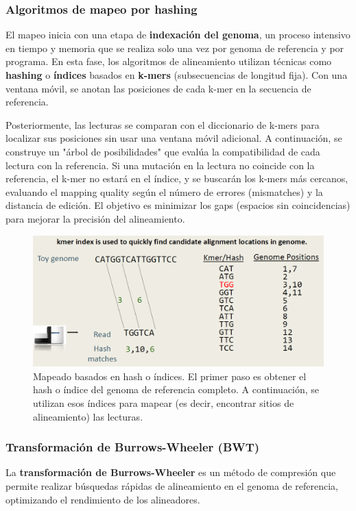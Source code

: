\subsubsection{Algoritmos de mapeo por hashing}
El mapeo inicia con una etapa de \textbf{indexación del genoma}, un proceso intensivo en tiempo y memoria que se realiza solo una vez por genoma de referencia y por programa. En esta fase, los algoritmos de alineamiento utilizan técnicas como \textbf{hashing} o \textbf{índices} basados en \textbf{k-mers} (subsecuencias de longitud fija). Con una ventana móvil, se anotan las posiciones de cada k-mer en la secuencia de referencia.

Posteriormente, las lecturas se comparan con el diccionario de k-mers para localizar sus posiciones sin usar una ventana móvil adicional. A continuación, se construye un "árbol de posibilidades" que evalúa la compatibilidad de cada lectura con la referencia. Si una mutación en la lectura no coincide con la referencia, el k-mer no estará en el índice, y se buscarán los k-mers más cercanos, evaluando el mapping quality según el número de errores (mismatches) y la distancia de edición. El objetivo es minimizar los gaps (espacios sin coincidencias) para mejorar la precisión del alineamiento.

\begin{figure}[htbp]
\centering
\includegraphics[width = \textwidth]{figs/hash-mapping.png}
\caption{Mapeado basados en hash o índices. El primer paso es obtener el hash o índice del genoma de referencia completo. A continuación, se utilizan esos índices para mapear (es decir, encontrar sitios de alineamiento) las lecturas.}
\end{figure}

\subsubsection{Transformación de Burrows-Wheeler (BWT)}
La \textbf{transformación de Burrows-Wheeler} es un método de compresión que permite realizar búsquedas rápidas de alineamiento en el genoma de referencia, optimizando el rendimiento de los alineadores.

